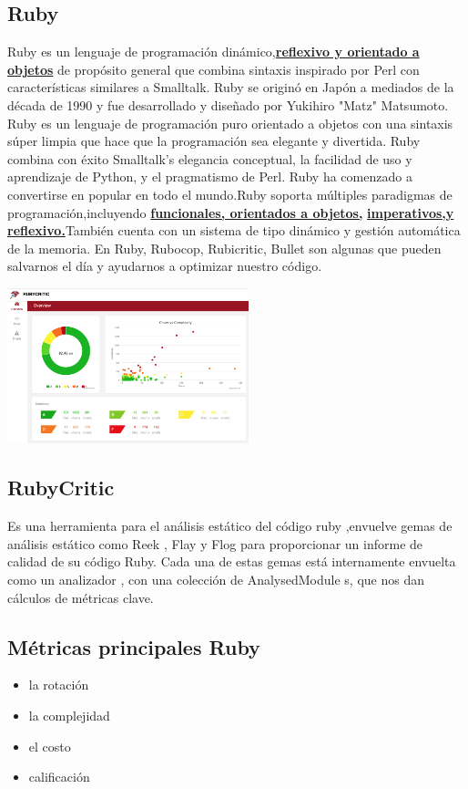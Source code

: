 \documentclass[twoside,twocolumn]{article}
\begin{document}
\subsection{Ruby}
Ruby es un lenguaje de programación dinámico,{\bf \underline {reflexivo y orientado a objetos}}  de propósito general que combina sintaxis
inspirado por Perl con características similares a Smalltalk. Ruby se originó en Japón a mediados de la década de 1990 y fue
desarrollado y diseñado por Yukihiro "Matz" Matsumoto. Ruby es un lenguaje de programación puro orientado a objetos
con una sintaxis súper limpia que hace que la programación sea elegante y divertida. Ruby combina con éxito Smalltalk's
elegancia conceptual, la facilidad de uso y aprendizaje de Python, y el pragmatismo de Perl. Ruby ha comenzado a convertirse en
popular en todo el mundo.Ruby soporta múltiples paradigmas de programación,incluyendo {\bf \underline {funcionales, orientados a objetos,}}
{\bf \underline {imperativos,y reflexivo.}}También cuenta con un sistema de tipo dinámico y gestión automática de la memoria.
En  Ruby,  Rubocop,  Rubicritic,  Bullet  son  algunas  que  pueden  salvarnos  el  día  y ayudarnos a optimizar nuestro código.
\begin{center}
	\includegraphics[width=7cm]{./Imagenes/ruby} 
	\end{center}
\subsection {RubyCritic}
\begin{itemize}
Es una herramienta para el análisis estático del código ruby ,envuelve gemas de análisis estático como Reek , Flay y Flog para proporcionar un informe de calidad de su código Ruby.
Cada una de estas gemas está internamente envuelta como un analizador , con una colección de AnalysedModule s, que nos dan cálculos de métricas clave.
\end{itemize}
\subsection {Métricas principales Ruby}
\begin{itemize}
\item la rotación
\item la complejidad
\item el costo 
\item calificación
\end{itemize}
\end{document}
